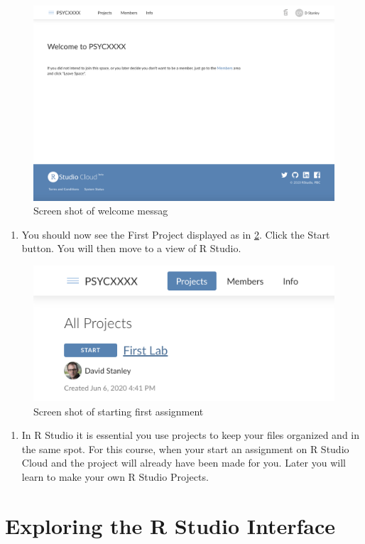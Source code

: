 \documentclass[
]{krantz}
\providecommand{\tightlist}{%
  \setlength{\itemsep}{0pt}\setlength{\parskip}{0pt}}
\begin{document}
\begin{figure}
\includegraphics[width=0.7\linewidth]{ch_introduction/images/screenshot_welcome} \caption{Screen shot of welcome messag}\label{fig:welcome}
\end{figure}

\begin{enumerate}
\def\labelenumi{\arabic{enumi}.}
\setcounter{enumi}{4}
\tightlist
\item
  You should now see the First Project displayed as in \ref{fig:assignment}. Click the Start button. You will then move to a view of R Studio.
\end{enumerate}

\begin{figure}
\includegraphics[width=0.7\linewidth]{ch_introduction/images/screenshot_assignment} \caption{Screen shot of starting first assignment}\label{fig:assignment}
\end{figure}

\begin{enumerate}
\def\labelenumi{\arabic{enumi}.}
\setcounter{enumi}{4}
\tightlist
\item
  In R Studio it is essential you use projects to keep your files organized and in the same spot. For this course, when your start an assignment on R Studio Cloud and the project will already have been made for you. Later you will learn to make your own R Studio Projects.
\end{enumerate}

\hypertarget{exploring-the-r-studio-interface}{%
\section{Exploring the R Studio Interface}\label{exploring-the-r-studio-interface}}
\end{document}
